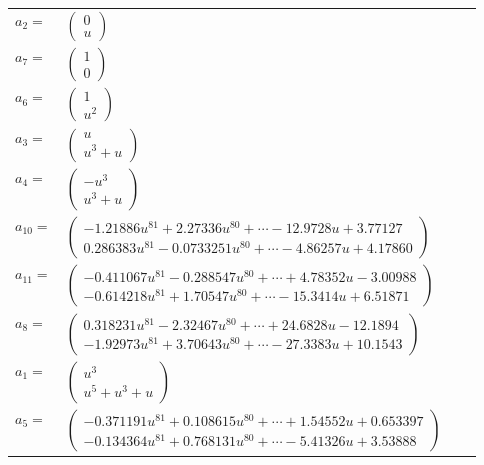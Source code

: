 \documentclass[1p]{elsarticle_modified}
\theoremstyle{definition}
\begin{document}
\begin{tabular}{m{7pt} m{180pt} m{7pt} m{180pt} }
\flushright $a_{2}=$&$\begin{pmatrix}0\\u\end{pmatrix}$ \\
\flushright $a_{7}=$&$\begin{pmatrix}1\\0\end{pmatrix}$ \\
\flushright $a_{6}=$&$\begin{pmatrix}1\\u^2\end{pmatrix}$ \\
\flushright $a_{3}=$&$\begin{pmatrix}u\\u^3+u\end{pmatrix}$ \\
\flushright $a_{4}=$&$\begin{pmatrix}- u^3\\u^3+u\end{pmatrix}$ \\
\flushright $a_{10}=$&$\begin{pmatrix}-1.21886 u^{81}+2.27336 u^{80}+\cdots-12.9728 u+3.77127\\0.286383 u^{81}-0.0733251 u^{80}+\cdots-4.86257 u+4.17860\end{pmatrix}$ \\
\flushright $a_{11}=$&$\begin{pmatrix}-0.411067 u^{81}-0.288547 u^{80}+\cdots+4.78352 u-3.00988\\-0.614218 u^{81}+1.70547 u^{80}+\cdots-15.3414 u+6.51871\end{pmatrix}$ \\
\flushright $a_{8}=$&$\begin{pmatrix}0.318231 u^{81}-2.32467 u^{80}+\cdots+24.6828 u-12.1894\\-1.92973 u^{81}+3.70643 u^{80}+\cdots-27.3383 u+10.1543\end{pmatrix}$ \\
\flushright $a_{1}=$&$\begin{pmatrix}u^3\\u^5+u^3+u\end{pmatrix}$ \\
\flushright $a_{5}=$&$\begin{pmatrix}-0.371191 u^{81}+0.108615 u^{80}+\cdots+1.54552 u+0.653397\\-0.134364 u^{81}+0.768131 u^{80}+\cdots-5.41326 u+3.53888\end{pmatrix}$ \\

\end{tabular}
\end{document}

